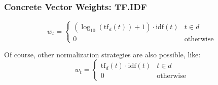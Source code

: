            \subsubsection{Concrete Vector Weights: TF.IDF} %
                \begin{equation*}
                    w_t =
                    	\begin{cases}
	                    	(\log_{10}(\text{tf}_d(t)) + 1) \cdot \text{idf}(t) & t \in d \\
	                    	0 & \text{otherwise}
                    	\end{cases}
                \end{equation*}
                
                Of course, other normalization strategies are also possible, like:
                \begin{equation*}
					w_t =
						\begin{cases}
							\text{tf}_d(t) \cdot \text{idf}(t) & t \in d \\
							0 & \text{otherwise}
						\end{cases}
				\end{equation*}

